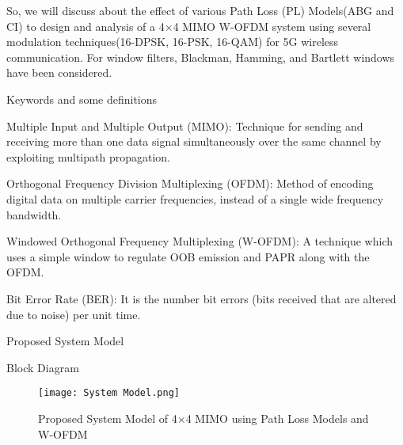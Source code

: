 \documentclass{beamer}
\begin{document}
\begin{frame}{}
\begin{block}{}
   So, we will discuss about the effect of various Path Loss (PL) Models(ABG and CI) to design and analysis of a 4$\times$4 MIMO W-OFDM system using several modulation techniques(16-DPSK, 16-PSK, 16-QAM) for 5G wireless communication. For window filters, Blackman, Hamming, and Bartlett windows have been considered.
\end{block}
\end{frame}

\begin{frame}{Keywords and some definitions}
   \begin{block}{Multiple Input and Multiple Output (MIMO):}
      Technique for sending and receiving more than one data signal simultaneously over the same channel by exploiting multipath propagation.  
   \end{block}
   \begin{block}{Orthogonal Frequency Division Multiplexing (OFDM):}
   Method of encoding digital data on multiple carrier frequencies, instead of a single wide frequency bandwidth.
   \end{block}
   \begin{block}{Windowed Orthogonal Frequency Multiplexing (W-OFDM):}
   A technique which uses a simple window to regulate OOB emission
   and PAPR along with the OFDM.
   \end{block}
   \begin{block}{Bit Error Rate (BER):}
    It is the number bit errors (bits received that are altered due to noise) per unit time.
   \end{block}
\end{frame}

\begin{frame}{Proposed System Model}
   \begin{block}{Block Diagram}
    \begin{figure}
    \centering
    \texttt{[image: System Model.png]}
    \caption{Proposed System Model of 4$\times$4 MIMO using Path Loss Models and W-OFDM}
    \label{fig:my_label}
    \end{figure}
  \end{block}
\end{frame}
\end{document}

